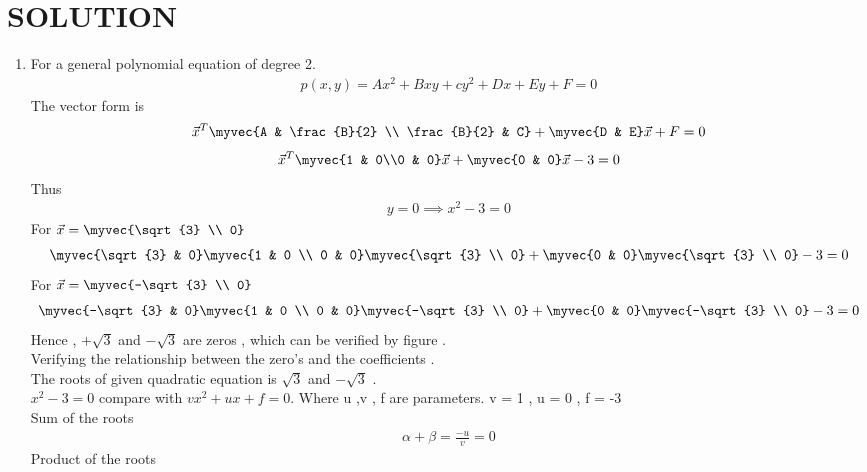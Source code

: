 \documentclass[journal,12pt,twocolumn]{IEEEtran}
\begin{document}
\section{SOLUTION}  
\begin{enumerate}
\item
For a general polynomial equation of degree 2.
\begin{align}
p(x,y) = A{x}^2+Bxy+c{y}^2+Dx+Ey+F = 0
\end{align}
The vector form is
\begin{align}
\vec{x}^T \myvec{A & \frac{B}{2} \\ \frac{B}{2} & C} + \myvec{D & E}\vec{x} +F = 0
\end{align}
\begin{align}
\vec{x}^T \myvec{1 & 0\\0 & 0}\vec{x}+ \myvec{0 & 0}\vec{x}-3=0
\end{align}
Thus
\begin{align}
y=0\implies x^2-3 =0
\end{align}
For $\Vec{x} = \myvec{\sqrt{3} \\ 0}$
\begin{align}
\myvec{\sqrt{3} & 0} \myvec{1 & 0 \\ 0 & 0}\myvec{\sqrt{3} \\ 0} + \myvec{0 & 0}\myvec{\sqrt{3} \\ 0}-3 = 0
\end{align}
For $\vec{x} = \myvec{-\sqrt{3} \\ 0}$
\begin{align}
\myvec{-\sqrt{3} & 0} \myvec{1 & 0 \\ 0 & 0} \myvec{-\sqrt{3} \\ 0} + \myvec{0 & 0}\myvec{-\sqrt{3} \\ 0} -3 = 0
\end{align} 
Hence , $+\sqrt{3}$ and $-\sqrt{3}$ are zeros , which can be verified by figure .
\\
Verifying the relationship between the zero's and the coefficients .
\\
The roots of given quadratic equation is $\sqrt{3}$ and $-\sqrt{3}$ .
\\
${x}^2-3=0$ compare with $v{x}^2+u{x}+f = 0 $. Where u ,v , f are parameters. v = 1 , u = 0 , f = -3
\\
Sum of the roots
\begin{align}
\alpha + \beta = \frac{-u}{v} = 0
\end{align}
Product of the roots
\begin{align}

\end{align}
\end{enumerate}
\end{document}
